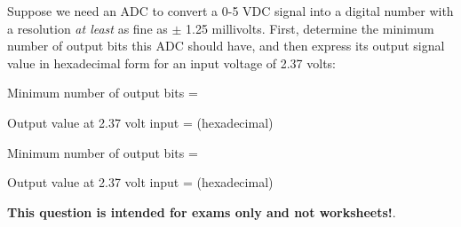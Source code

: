 

Suppose we need an ADC to convert a 0-5 VDC signal into a digital number with a resolution {\it at least} as fine as $\pm$ 1.25 millivolts.  First, determine the minimum number of output bits this ADC should have, and then express its output signal value in hexadecimal form for an input voltage of 2.37 volts:

\vskip 10pt

Minimum number of output bits = \underbar{\hskip 50pt}

\vskip 10pt

Output value at 2.37 volt input = \underbar{\hskip 50pt} (hexadecimal)







Minimum number of output bits = 

\vskip 10pt

Output value at 2.37 volt input =  (hexadecimal)








{\bf This question is intended for exams only and not worksheets!}.



